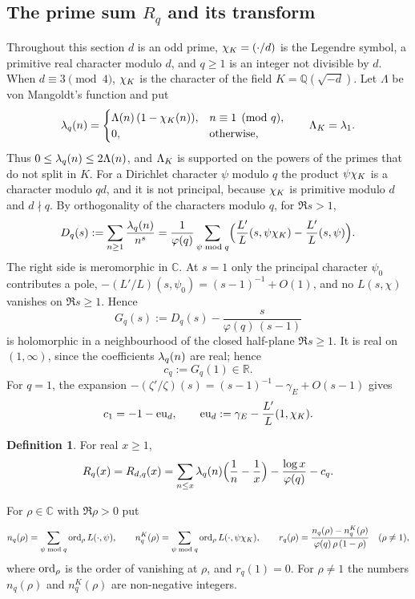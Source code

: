 \documentclass[10pt]{amsart}
\theoremstyle{definition}
\newtheorem{definition}[theorem]{Definition}
\theoremstyle{remark}
\begin{document}
\subsection{The prime sum \texorpdfstring{$R_q$}{R\_q} and its transform}\label{an:ssec-R}
Throughout this section $d$ is an odd prime, $\chi_K=(\cdot/d)$ is the
Legendre symbol, a primitive real character modulo $d$, and $q\ge1$ is an
integer not divisible by $d$. When $d\equiv3\pmod4$, $\chi_K$ is the
character of the field $K=\mathbb Q(\sqrt{-d})$. Let $\Lambda$ be von
Mangoldt's function and put
\[
 \lambda_q(n)=\begin{cases}\Lambda(n)\,(1-\chi_K(n)),& n\equiv1\pmod q,\\ 0,&\text{otherwise,}\end{cases}
 \qquad \Lambda_K=\lambda_1 .
\]
Thus $0\le\lambda_q(n)\le2\Lambda(n)$, and $\Lambda_K$ is supported on the powers
of the primes that do not split in $K$. For a Dirichlet character $\psi$
modulo $q$ the product $\psi\chi_K$ is a character modulo $qd$, and it is not
principal, because $\chi_K$ is primitive modulo $d$ and $d\nmid q$. By
orthogonality of the characters modulo $q$, for $\Re s>1$,
\begin{equation}\label{an:eq-D}
 D_q(s):=\sum_{n\ge1}\frac{\lambda_q(n)}{n^{s}}
 =\frac1{\varphi(q)}\sum_{\psi\bmod q}\Bigl(\frac{L'}{L}(s,\psi\chi_K)-\frac{L'}{L}(s,\psi)\Bigr).
\end{equation}
The right side is meromorphic in $\mathbb C$. At $s=1$ only the principal
character $\psi_0$ contributes a pole, $-(L'/L)(s,\psi_0)=(s-1)^{-1}+O(1)$,
and no $L(s,\chi)$ vanishes on $\Re s\ge1$. Hence
\[
 G_q(s):=D_q(s)-\frac{s}{\varphi(q)\,(s-1)}
\]
is holomorphic in a neighbourhood of the closed half-plane $\Re s\ge1$. It is
real on $(1,\infty)$, since the coefficients $\lambda_q(n)$ are real; hence
\[
 c_q:=G_q(1)\in\mathbb R .
\]
For $q=1$, the expansion $-(\zeta'/\zeta)(s)=(s-1)^{-1}-\gamma_E+O(s-1)$
gives
\begin{equation}\label{an:eq-c1}
 c_1=-1-\mathrm{eu}_d,\qquad \mathrm{eu}_d:=\gamma_E-\frac{L'}{L}(1,\chi_K).
\end{equation}

\begin{definition}\label{an:def-R}
For real $x\ge1$,
\[
 R_q(x)=R_{d,q}(x)=\sum_{n\le x}\lambda_q(n)\Bigl(\frac1n-\frac1x\Bigr)-\frac{\log x}{\varphi(q)}-c_q .
\]
\end{definition}

For $\rho\in\mathbb C$ with $\Re\rho>0$ put
\begin{equation}\label{an:eq-r}
 n_q(\rho)=\sum_{\psi\bmod q}\operatorname{ord}_\rho L(\cdot,\psi),\qquad
 n_q^{K}(\rho)=\sum_{\psi\bmod q}\operatorname{ord}_\rho L(\cdot,\psi\chi_K),\qquad
 r_q(\rho)=\frac{n_q(\rho)-n_q^{K}(\rho)}{\varphi(q)\,\rho\,(1-\rho)}\quad(\rho\ne1),
\end{equation}
where $\operatorname{ord}_\rho$ is the order of vanishing at $\rho$, and $r_q(1)=0$.
For $\rho\ne1$ the numbers $n_q(\rho)$ and $n_q^K(\rho)$ are non-negative
integers.
\end{document}
